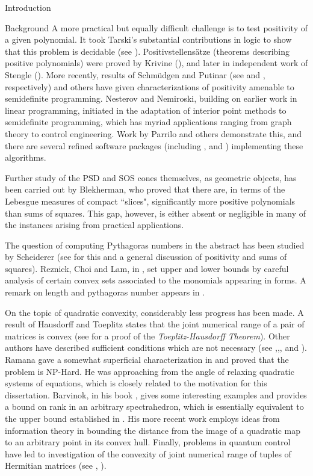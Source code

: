 \documentclass[12pt,oneside,final]{ucthesisucsbmath2010}
\theoremstyle{definition}
\begin{document}
\begin{chapter}{Introduction}
\begin{section}{Background}
A more practical but equally difficult challenge is to test positivity of a given polynomial. It took Tarski's substantial contributions in logic to show that this problem is decidable (see \cite{Tarski}). Positivstellens\"{a}tze (theorems describing positive polynomials) were proved by Krivine (\cite{Krivine}), and later in independent work of Stengle (\cite{Stengle}). More recently, results of Schm\"{u}dgen and Putinar (see \cite{konrad1} and \cite{Put0}, respectively) and others have given characterizations of positivity amenable to semidefinite programming. Nesterov and Nemiroski, building on earlier work in linear programming, initiated in \cite{NestNem} the adaptation of interior point methods to semidefinite programming, which has myriad applications ranging from graph theory to control engineering. Work by Parrilo and others demonstrate this, and there are several refined software packages (including \cite{sostools}, \cite{YALMIP} and \cite{GloptiPoly}) implementing these algorithms.

Further study of the PSD and SOS cones themselves, as geometric objects, has been carried out by Blekherman, who proved that there are, in terms of the Lebesgue measures of compact ``slices", significantly more positive polynomials than sums of squares. This gap, however, is either absent or negligible in many of the instances arising from practical applications.

The question of computing Pythagoras numbers in the abstract has been studied by Scheiderer (see \cite{Claus} for this and a general discussion of positivity and sums of squares). Reznick, Choi and Lam, in \cite{RezChoiLam}, set upper and lower bounds by careful analysis of certain convex sets associated to the monomials appearing in forms. A remark on length and pythagoras number appears in \cite{RAG}.

On the topic of quadratic convexity, considerably less progress has been made. A result of Hausdorff and Toeplitz states that the joint numerical range of a pair of matrices is convex (see \cite{Barvinok} for a proof of the \emph{Toeplitz-Hausdorff Theorem}). Other authors have described sufficient conditions which are not necessary (see \cite{Gut1},\cite{MR3005301},\cite{Poon2}, and \cite{Poon1}). Ramana gave a somewhat superficial characterization in \cite{Ramana95quadraticmaps} and proved that the problem is NP-Hard. He was approaching from the angle of relaxing quadratic systems of equations, which is closely related to the motivation for this dissertation.  Barvinok, in his book \cite{Barvinok}, gives some interesting examples and provides a bound on rank in an arbitrary spectrahedron, which is essentially equivalent to the upper bound established in \cite{RezChoiLam}. His more recent work employs ideas from information theory in bounding the distance from the image of a quadratic map to an arbitrary point in its convex hull. Finally, problems in quantum control have led to investigation of the convexity of joint numerical range of tuples of Hermitian matrices (see \cite{Gut1}, \cite{LiPoon}). 


\end{section}
\end{chapter}
\end{document}
